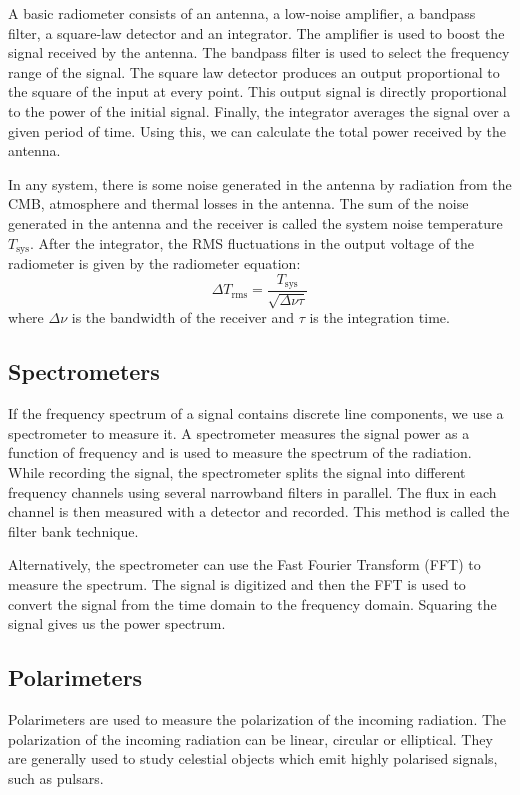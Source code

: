 \documentclass{article_saj}
\begin{document}
A basic radiometer consists of an antenna, a low-noise amplifier, a bandpass filter, a square-law detector and an integrator. The amplifier is used to boost the signal received by the antenna. The bandpass filter is used to select the frequency range of the signal. The square law detector produces an output proportional to the square of the input at every point. This output signal is directly proportional to the power of the initial signal. Finally, the integrator averages the signal over a given period of time. Using this, we can calculate the total power received by the antenna.  

In any system, there is some noise generated in the antenna by radiation from the CMB, atmosphere and thermal losses in the antenna. The sum of the noise generated in the antenna and the receiver is called the system noise temperature $T_{\text{sys}}$. After the integrator, the RMS fluctuations in the output voltage of the radiometer is given by the radiometer equation:
\begin{equation}
  \Delta T_{\text{rms}} = \frac{T_{\text{sys}}}{\sqrt{\Delta\nu\tau}}
\end{equation}
where $\Delta\nu$ is the bandwidth of the receiver and $\tau$ is the integration time.

\subsection{Spectrometers}
If the frequency spectrum of a signal contains discrete line components, we use a spectrometer to measure it. A spectrometer measures the signal power as a function of frequency and is used to measure the spectrum of the radiation. While recording the signal, the spectrometer splits the signal into different frequency channels using several narrowband filters in parallel. The flux in each channel is then measured with a detector and recorded. This method is called the filter bank technique.

Alternatively, the spectrometer can use the Fast Fourier Transform (FFT) to measure the spectrum. The signal is digitized and then the FFT is used to convert the signal from the time domain to the frequency domain. Squaring the signal gives us the power spectrum.

\subsection{Polarimeters}
Polarimeters are used to measure the polarization of the incoming radiation. The polarization of the incoming radiation can be linear, circular or elliptical. They are generally used to study celestial objects which emit highly polarised signals, such as pulsars. 
\end{document}
